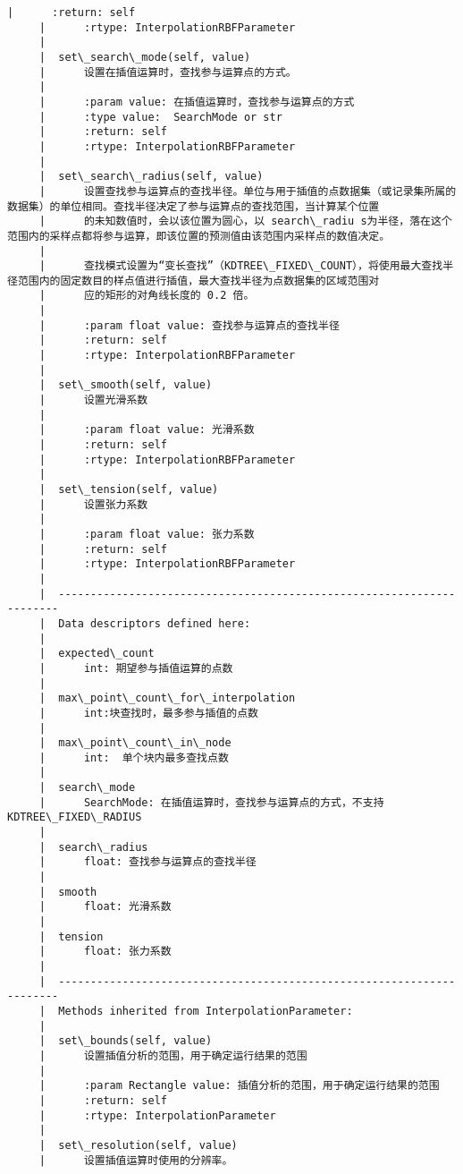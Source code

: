 \documentclass[11pt]{article}
\begin{document}
\begin{Verbatim}[commandchars=\\\{\}]
     |      :return: self
     |      :rtype: InterpolationRBFParameter
     |  
     |  set\_search\_mode(self, value)
     |      设置在插值运算时，查找参与运算点的方式。
     |      
     |      :param value: 在插值运算时，查找参与运算点的方式
     |      :type value:  SearchMode or str
     |      :return: self
     |      :rtype: InterpolationRBFParameter
     |  
     |  set\_search\_radius(self, value)
     |      设置查找参与运算点的查找半径。单位与用于插值的点数据集（或记录集所属的数据集）的单位相同。查找半径决定了参与运算点的查找范围，当计算某个位置
     |      的未知数值时，会以该位置为圆心，以 search\_radiu s为半径，落在这个范围内的采样点都将参与运算，即该位置的预测值由该范围内采样点的数值决定。
     |      
     |      查找模式设置为“变长查找”（KDTREE\_FIXED\_COUNT），将使用最大查找半径范围内的固定数目的样点值进行插值，最大查找半径为点数据集的区域范围对
     |      应的矩形的对角线长度的 0.2 倍。
     |      
     |      :param float value: 查找参与运算点的查找半径
     |      :return: self
     |      :rtype: InterpolationRBFParameter
     |  
     |  set\_smooth(self, value)
     |      设置光滑系数
     |      
     |      :param float value: 光滑系数
     |      :return: self
     |      :rtype: InterpolationRBFParameter
     |  
     |  set\_tension(self, value)
     |      设置张力系数
     |      
     |      :param float value: 张力系数
     |      :return: self
     |      :rtype: InterpolationRBFParameter
     |  
     |  ----------------------------------------------------------------------
     |  Data descriptors defined here:
     |  
     |  expected\_count
     |      int: 期望参与插值运算的点数
     |  
     |  max\_point\_count\_for\_interpolation
     |      int:块查找时，最多参与插值的点数
     |  
     |  max\_point\_count\_in\_node
     |      int:  单个块内最多查找点数
     |  
     |  search\_mode
     |      SearchMode: 在插值运算时，查找参与运算点的方式，不支持 KDTREE\_FIXED\_RADIUS
     |  
     |  search\_radius
     |      float: 查找参与运算点的查找半径
     |  
     |  smooth
     |      float: 光滑系数
     |  
     |  tension
     |      float: 张力系数
     |  
     |  ----------------------------------------------------------------------
     |  Methods inherited from InterpolationParameter:
     |  
     |  set\_bounds(self, value)
     |      设置插值分析的范围，用于确定运行结果的范围
     |      
     |      :param Rectangle value: 插值分析的范围，用于确定运行结果的范围
     |      :return: self
     |      :rtype: InterpolationParameter
     |  
     |  set\_resolution(self, value)
     |      设置插值运算时使用的分辨率。

\end{Verbatim}
\end{document}
